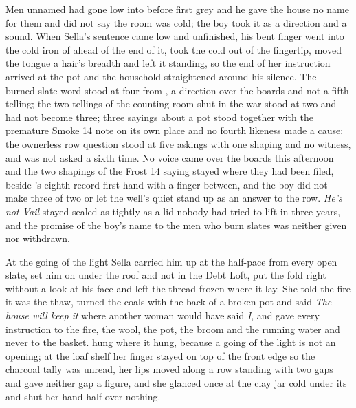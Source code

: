 Men unnamed had gone low into  before first grey and he gave the house no name for them and did not say the room was cold; the boy took it as a direction and a sound. When Sella's sentence came low and unfinished, his bent finger went into the cold iron of  ahead of the end of it, took the cold out of the fingertip, moved the tongue a hair's breadth and left it standing, so the end of her instruction arrived at the pot and the household straightened around his silence. The burned-slate word stood at four from , a direction over the boards and not a fifth telling; the two tellings of the counting room shut in the war stood at two and had not become three; three sayings about a pot stood together with the premature Smoke 14 note on its own place and no fourth likeness made a cause; the ownerless row question stood at five askings with one shaping and no witness, and was not asked a sixth time. No voice came over the boards this afternoon and the two shapings of the Frost 14 saying stayed where they had been filed, beside 's eighth record-first hand with a finger between, and the boy did not make three of two or let the well's quiet stand up as an answer to the row. \emph{He's not Vail} stayed sealed as tightly as a lid nobody had tried to lift in three years, and the promise of the boy's name to the men who burn slates was neither given nor withdrawn.

\scenebreak

At the going of the light Sella carried him up at the half-pace from every open slate, set him on  under the roof and not in the Debt Loft, put the fold right without a look at his face and left the thread frozen where it lay. She told the fire it was the thaw, turned the coals with the back of a broken pot and said \emph{The house will keep it} where another woman would have said \emph{I}, and gave every instruction to the fire, the wool, the pot, the broom and the running water and never to the basket.  hung where it hung, because a going of the light is not an opening; at the loaf shelf her finger stayed on top of the front edge so the charcoal tally was unread, her lips moved along a row standing with two gaps and gave neither gap a figure, and she glanced once at the clay jar cold under its  and shut her hand half over nothing.

